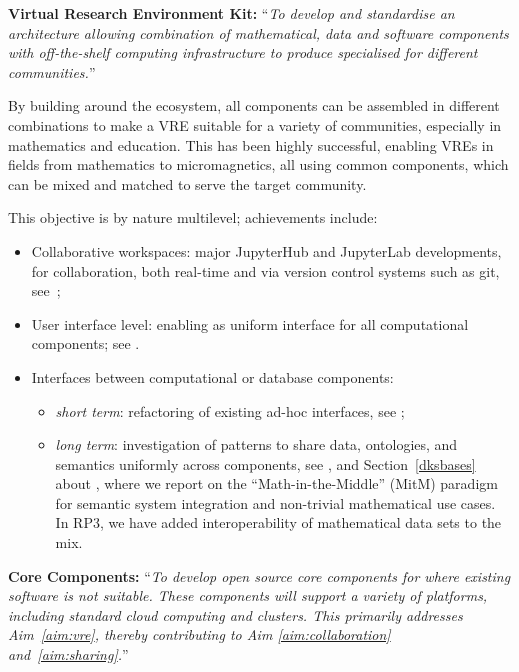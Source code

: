 \begin{compactenum}[\bf {Obj} 1\rm]
\item\label{objective:framework} \textbf{Virtual Research Environment Kit:} ``\emph{To develop and standardise an architecture
    allowing combination of mathematical, data and software components with off-the-shelf
    computing infrastructure to produce specialised \VREs for different communities.}''

  By building around the \Jupyter ecosystem,
  all \ODK components can be assembled in different combinations
  to make a VRE suitable for a variety of communities,
  especially in mathematics and education.
  This has been highly successful,
  enabling VREs in fields from mathematics
  to micromagnetics,
  all using common \ODK components,
  which can be mixed and matched to serve
  the target community.

  This objective is by nature multilevel; achievements include:
  \begin{itemize}
  \item Collaborative workspaces: major JupyterHub and JupyterLab developments,
  for collaboration,
  both real-time and via version control systems such as git,
    see~;
  \item User interface level: enabling \Jupyter as uniform interface for all computational
    components; see .
  \item Interfaces between computational or database components:
    \begin{itemize}
    \item \emph{short term}: refactoring of existing ad-hoc interfaces, see ;
    \item \emph{long term}: investigation of patterns to share data, ontologies, and semantics uniformly across components, see , and Section~\ref{dksbases} about , where we report on the ``Math-in-the-Middle'' (MitM) paradigm for semantic system integration and non-trivial mathematical use cases. In RP3, we have added interoperability of mathematical data sets to the mix.
  \end{itemize}
\end{itemize}

\item\label{objectives:core} \textbf{Core Components:}
  ``\emph{To develop open source core components
  for \VREs where existing software is not suitable. These components
  will support a variety of platforms, including standard cloud
  computing and clusters. This primarily addresses Aim~\ref{aim:vre},
  thereby contributing to Aim \ref{aim:collaboration}
  and~\ref{aim:sharing}.}''


\end{compactenum}
